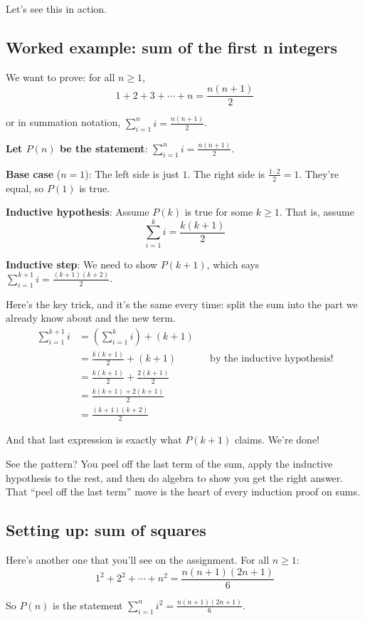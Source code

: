 \documentclass[11pt]{article}
\begin{document}
Let's see this in action.

\subsection{Worked example: sum of the first n integers}
We want to prove: for all $n \geq 1$,
\[
1 + 2 + 3 + \cdots + n = \frac{n(n+1)}{2}
\]

or in summation notation, $\displaystyle\sum_{i=1}^{n} i = \frac{n(n+1)}{2}$.

\textbf{Let $P(n)$ be the statement}: $\displaystyle\sum_{i=1}^{n} i = \frac{n(n+1)}{2}$.

\textbf{Base case} ($n = 1$): The left side is just $1$. The right side is $\frac{1 \cdot 2}{2} = 1$. They're equal, so $P(1)$ is true.

\textbf{Inductive hypothesis}: Assume $P(k)$ is true for some $k \geq 1$. That is, assume
\[
\sum_{i=1}^{k} i = \frac{k(k+1)}{2}
\]

\textbf{Inductive step}: We need to show $P(k+1)$, which says $\displaystyle\sum_{i=1}^{k+1} i = \frac{(k+1)(k+2)}{2}$.

Here's the key trick, and it's the same every time: split the sum into the part we already know about and the new term.
\begin{align*}
\sum_{i=1}^{k+1} i &= \left(\sum_{i=1}^{k} i\right) + (k+1) \\
&= \frac{k(k+1)}{2} + (k+1) && \text{by the inductive hypothesis!} \\
&= \frac{k(k+1)}{2} + \frac{2(k+1)}{2} \\
&= \frac{k(k+1) + 2(k+1)}{2} \\
&= \frac{(k+1)(k+2)}{2}
\end{align*}

And that last expression is exactly what $P(k+1)$ claims. We're done!

See the pattern? You peel off the last term of the sum, apply the inductive hypothesis to the rest, and then do algebra to show you get the right answer. That ``peel off the last term'' move is the heart of every induction proof on sums.

\subsection{Setting up: sum of squares}
Here's another one that you'll see on the assignment. For all $n \geq 1$:
\[
1^2 + 2^2 + \cdots + n^2 = \frac{n(n+1)(2n+1)}{6}
\]

So $P(n)$ is the statement $\displaystyle\sum_{i=1}^{n} i^2 = \frac{n(n+1)(2n+1)}{6}$.
\end{document}
